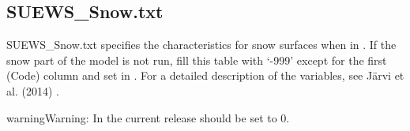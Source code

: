 \documentclass[letterpaper,10pt,english]{sphinxmanual}
\begin{document}
\subsection{SUEWS\_Snow.txt}
\label{\detokenize{input_files/SUEWS_SiteInfo/SUEWS_Snow:suews-snow-txt}}\label{\detokenize{input_files/SUEWS_SiteInfo/SUEWS_Snow::doc}}\label{\detokenize{input_files/SUEWS_SiteInfo/SUEWS_Snow:id1}}
SUEWS\_Snow.txt specifies the characteristics for snow surfaces when
{\hyperref[\detokenize{input_files/RunControl/Model_run_options:cmdoption-arg-snowuse}]{}} in {\hyperref[\detokenize{input_files/RunControl/RunControl:runcontrol-nml}]{}}. If the snow part of
the model is not run, fill this table with ‘-999’ except for the first
(Code) column and set {\hyperref[\detokenize{input_files/RunControl/Model_run_options:cmdoption-arg-snowuse}]{}} in {\hyperref[\detokenize{input_files/RunControl/RunControl:runcontrol-nml}]{}}.
For a detailed description of the variables, see Järvi et al.
(2014) \label{\detokenize{input_files/SUEWS_SiteInfo/SUEWS_Snow:id2}}{\hyperref[\detokenize{references:leena2014}]{\sphinxcrossref{{[}Leena2014{]}}}}.

\begin{sphinxadmonition}{warning}{Warning:}
In the current release {\hyperref[\detokenize{input_files/RunControl/Model_run_options:cmdoption-arg-snowuse}]{}} should be set to 0.
\end{sphinxadmonition}
\end{document}
